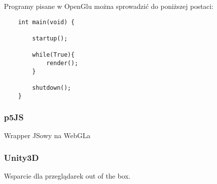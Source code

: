 Programy pisane w OpenGlu można sprowadzić do poniższej postaci:

\begin{lstlisting}
	int main(void) {
	
		startup();
		
		while(True){
			render();
		}
		
		shutdown();
	}
\end{lstlisting}

\subsubsection{p5JS}

Wrapper JSowy na WebGLa

\subsubsection{Unity3D}

Wsparcie dla przeglądarek out of the box.
